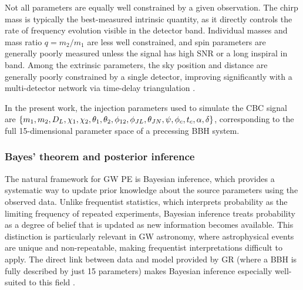 Not all parameters are equally well constrained by a given 
observation. The chirp mass is typically the best-measured intrinsic quantity, as it directly controls the rate of frequency evolution visible in the detector band. Individual masses and mass ratio $q = m_2/m_1$ are less well constrained, and spin parameters are generally poorly measured unless the signal has high SNR or a long 
inspiral in band. Among the extrinsic parameters, the sky position and distance are generally poorly constrained by a single detector, improving significantly with a multi-detector network via time-delay triangulation \cite{triangulation_GW}.

In the present work, the injection parameters used to simulate the CBC signal are $\{m_1, m_2, D_L, \chi_1, \\ \chi_2, \theta_1, \theta_2, \phi_{12}, \phi_{JL}, \theta_{JN}, \psi, \phi_c, t_c, \alpha, \delta\}$, corresponding to the full 15-dimensional parameter space of a precessing BBH system.

\subsubsection{Bayes' theorem and posterior inference}
\label{sec:bayes}

The natural framework for GW PE is Bayesian inference, which 
provides a systematic way to update prior knowledge about the source parameters using the observed data. Unlike frequentist statistics, which interprets probability as the limiting frequency of repeated experiments, Bayesian inference treats probability as a degree of belief that is updated as new information becomes available. This distinction is particularly relevant in GW astronomy, 
where astrophysical events are unique and non-repeatable, making frequentist interpretations difficult to apply. The direct link between data and model provided by GR (where a BBH is fully described by just 15 parameters) makes Bayesian inference especially well-suited to this field \cite{bayesfactor_8}.

